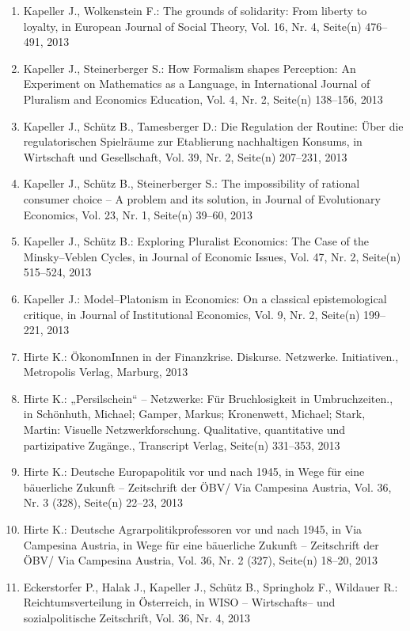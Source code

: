 \begin{enumerate}
	 \item Kapeller J., Wolkenstein F.: The grounds of solidarity: From liberty to loyalty, in European Journal of Social Theory, Vol. 16, Nr. 4, Seite(n) 476--491, 2013
	 \item Kapeller J., Steinerberger S.: How Formalism shapes Perception: An Experiment on Mathematics as a Language, in International Journal of Pluralism and Economics Education, Vol. 4, Nr. 2, Seite(n) 138--156, 2013
	 \item Kapeller J., Schütz B., Tamesberger D.: Die Regulation der Routine: Über die regulatorischen Spielräume zur Etablierung nachhaltigen Konsums, in Wirtschaft und Gesellschaft, Vol. 39, Nr. 2, Seite(n) 207--231, 2013
	 \item Kapeller J., Schütz B., Steinerberger S.: The impossibility of rational consumer choice -- A problem and its solution, in Journal of Evolutionary Economics, Vol. 23, Nr. 1, Seite(n) 39--60, 2013
	 \item Kapeller J., Schütz B.: Exploring Pluralist Economics: The Case of the Minsky--Veblen Cycles, in Journal of Economic Issues, Vol. 47, Nr. 2, Seite(n) 515--524, 2013
	 \item Kapeller J.: Model--Platonism in Economics: On a classical epistemological critique, in Journal of Institutional Economics, Vol. 9, Nr. 2, Seite(n) 199--221, 2013
	 \item Hirte K.: ÖkonomInnen in der Finanzkrise. Diskurse. Netzwerke. Initiativen., Metropolis Verlag, Marburg, 2013
	 \item Hirte K.: „Persilschein“ – Netzwerke: Für Bruchlosigkeit in Umbruchzeiten., in Schönhuth, Michael; Gamper, Markus; Kronenwett, Michael; Stark, Martin: Visuelle Netzwerkforschung. Qualitative, quantitative und partizipative Zugänge., Transcript Verlag, Seite(n) 331--353, 2013
	 \item Hirte K.: Deutsche Europapolitik vor und nach 1945, in Wege für eine bäuerliche Zukunft – Zeitschrift der ÖBV/ Via Campesina Austria, Vol. 36, Nr. 3 (328), Seite(n) 22--23, 2013
	 \item Hirte K.: Deutsche Agrarpolitikprofessoren vor und nach 1945, in Via Campesina Austria, in Wege für eine bäuerliche Zukunft – Zeitschrift der ÖBV/ Via Campesina Austria, Vol. 36, Nr. 2 (327), Seite(n) 18--20, 2013
	 \item Eckerstorfer P., Halak J., Kapeller J., Schütz B., Springholz F., Wildauer R.: Reichtumsverteilung in Österreich, in WISO -- Wirtschafts-- und sozialpolitische Zeitschrift, Vol. 36, Nr. 4, 2013

\end{enumerate}
